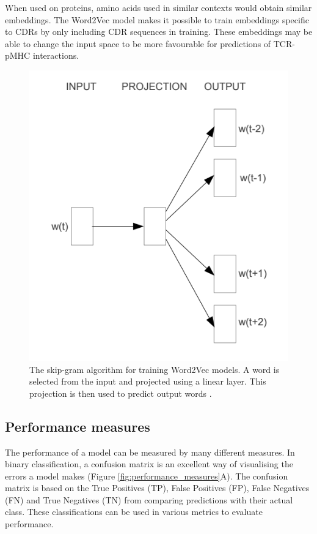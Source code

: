 When used on proteins, amino acids used in similar contexts would obtain similar embeddings. The Word2Vec model makes it possible to train embeddings specific to CDRs by only including CDR sequences in training. These embeddings may be able to change the input space to be more favourable for predictions of TCR-pMHC interactions.
\begin{figure}
    \centering
    \includegraphics[scale=0.9]{figures/skip_gram.png}
    \caption{The skip-gram algorithm for training Word2Vec models. A word is selected from the input and projected using a linear layer. This projection is then used to predict output words \cite{Mikolov2013EfficientSpace}.}
    \label{fig:skip_gram}
\end{figure}

\subsection{Performance measures}
The performance of a model can be measured by many different measures. In binary classification, a confusion matrix is an excellent way of visualising the errors a model makes (Figure \ref{fig:performance_measures}A). The confusion matrix is based on the True Positives (TP), False Positives (FP), False Negatives (FN) and True Negatives (TN) from comparing predictions with their actual class. These classifications can be used in various metrics to evaluate performance.


